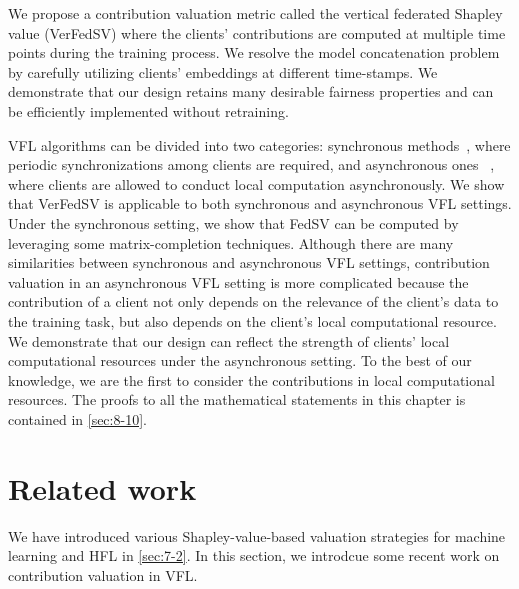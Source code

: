 We propose a contribution valuation metric called the vertical federated Shapley value (VerFedSV)
where the clients' contributions are computed at multiple time points during the training process. We resolve the model concatenation problem by carefully utilizing clients' embeddings at different time-stamps. 
We demonstrate that our design retains many desirable fairness properties and can be efficiently implemented without retraining. 

VFL algorithms can be divided into two categories: synchronous methods~\citep{Gong2016PrivateDA,Zhang2018FeatureDistributedSF,liu2019communication}, where periodic synchronizations
 among clients are required, and asynchronous ones
 ~\citep{Hu2019FDMLAC,Gu2020PrivacyPreservingAF,chen2020vafl}, where clients are allowed to conduct local computation asynchronously. We show that VerFedSV is applicable to both synchronous and asynchronous VFL settings. Under the synchronous setting, we show that FedSV can be computed by leveraging some matrix-completion techniques. Although there are many similarities between synchronous and asynchronous VFL settings, contribution valuation in an asynchronous VFL setting is more complicated because the contribution of a client not only depends on the relevance of the client's data to the training task, but also depends on the client's local computational resource. We demonstrate that our design can reflect the strength of clients' local computational resources under the asynchronous setting. To the best of our knowledge, we are the first to consider the contributions in local computational resources. The proofs to all the mathematical statements in this chapter is contained in \autoref{sec:8-10}.

\section{Related work} \label{sec:8-2}

We have introduced various Shapley-value-based valuation strategies for machine learning and HFL in \autoref{sec:7-2}. In this section, we introdcue some recent work on contribution valuation in VFL. 

